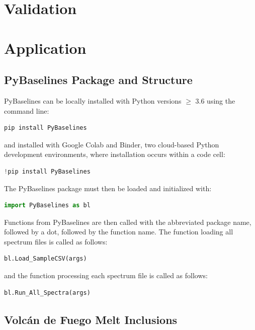 \documentclass[draft]{agujournal2019}
\begin{document}
\section{Validation}







\section{Application}

\subsection{PyBaselines Package and Structure}
PyBaselines can be locally installed with Python versions $\ge$ 3.6 using the command line: 
\begin{lstlisting}[language=Python]
pip install PyBaselines 
\end{lstlisting}
and installed with Google Colab and Binder, two cloud-based Python development environments, where installation occurs within a code cell: 
\begin{lstlisting}[language=Python]
!pip install PyBaselines 
\end{lstlisting}
The PyBaselines package must then be loaded and initialized with: 
\begin{lstlisting}[language=Python]
import PyBaselines as bl
\end{lstlisting}
Functions from PyBaselines are then called with the abbreviated package name, followed by a dot, followed by the function name. The function loading all spectrum files is called as follows: 
\begin{lstlisting}[language=Python]
bl.Load_SampleCSV(args)
\end{lstlisting}
and the function processing each spectrum file is called as follows: 
\begin{lstlisting}[language=Python]
bl.Run_All_Spectra(args)
\end{lstlisting}

\subsection{Volcán de Fuego Melt Inclusions}
\end{document}
